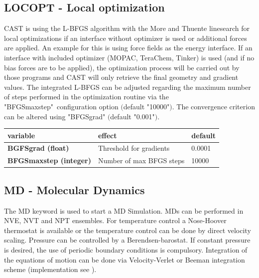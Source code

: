 \documentclass[10pt,a4paper]{article} %
\newif\ifdevmode %
\begin{document}
	\subsection{LOCOPT - Local optimization}
	\label{sec:locopt}
	\ac{CAST} is using the L-BFGS algorithm\supercite{bfgs} with the More and Thuente linesearch\supercite{morethuente} for local optimizations if an interface without optimizer is used or additional forces are applied. An example for this is using force fields as the energy interface. \ifdevmode ~\\ \colorbox{red}{what does additional forces applied mean?} ~\\ \fi
	If an interface with included optimizer (MOPAC, TeraChem, Tinker) is used (and if no bias forces are to be applied), the optimization process will be carried out by those programs and \ac{CAST} will only retrieve the final geometry and gradient values.
	The integrated L-BFGS can be adjusted regarding the maximum number of steps performed in the optimization routine via the "BFGSmaxstep"\ configuration option $($default "10000"$)$.
	The convergence criterion can be altered using "BFGSgrad" $($default "0.001"$)$.

	\begin{tabularx}{\textwidth}{l|l|l}
		variable & effect & default \\
		\hline
		\textbf{BGFSgrad (float)} & Threshold for gradients & 0.0001 \\
		\textbf{BFGSmaxstep (integer)} & Number of max BFGS steps & 10000 \\
	\end{tabularx}

	\subsection{MD - Molecular Dynamics}
	The MD keyword is used to start a \acf{MD} Simulation\supercite{md_art}. \acp{MD} can be performed in NVE, NVT and NPT ensembles. For temperature control a Nose-Hoover thermostat\supercite{nose,hoover} is available or the temperature control can be done by direct velocity scaling. Pressure can be controlled by a Berendsen-barostat\supercite{berendsen}. If constant pressure is desired, the use of periodic boundary conditions is compulsory. Integration of the equations of motion can be done via Velocity-Verlet or Beeman\supercite{beeman} integration scheme (implementation see \cite{becker_development_2015}). 
\end{document}
